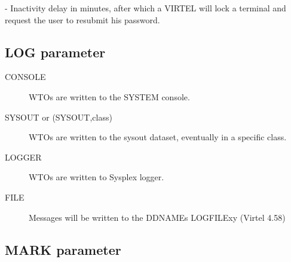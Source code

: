 \documentclass[letterpaper,10pt,english]{sphinxmanual}
\begin{document}
 - Inactivity delay in minutes, after which a VIRTEL will lock a terminal and request the user to resubmit his password.


\subsection{LOG parameter}
\label{\detokenize{Installation_Guide:log-parameter}}\label{\detokenize{Installation_Guide:index-86}}
\begin{sphinxVerbatim}[commandchars=\\\{\}]
                    
\end{sphinxVerbatim}
\begin{description}
\item[{CONSOLE}] \leavevmode
WTOs are written to the SYSTEM console.

\item[{SYSOUT or (SYSOUT,class)}] \leavevmode
WTOs are written to the sysout dataset, eventually in a specific class.

\item[{LOGGER}] \leavevmode
WTOs are written to Sysplex logger.

\item[{FILE}] \leavevmode
Messages will be written to the DDNAMEs LOGFILEx\textbar{}y               (Virtel 4.58)

\end{description}


\subsection{MARK parameter}
\label{\detokenize{Installation_Guide:index-87}}\label{\detokenize{Installation_Guide:mark-parameter}}
\begin{sphinxVerbatim}[commandchars=\\\{\}]
                              
\end{sphinxVerbatim}
\end{document}
